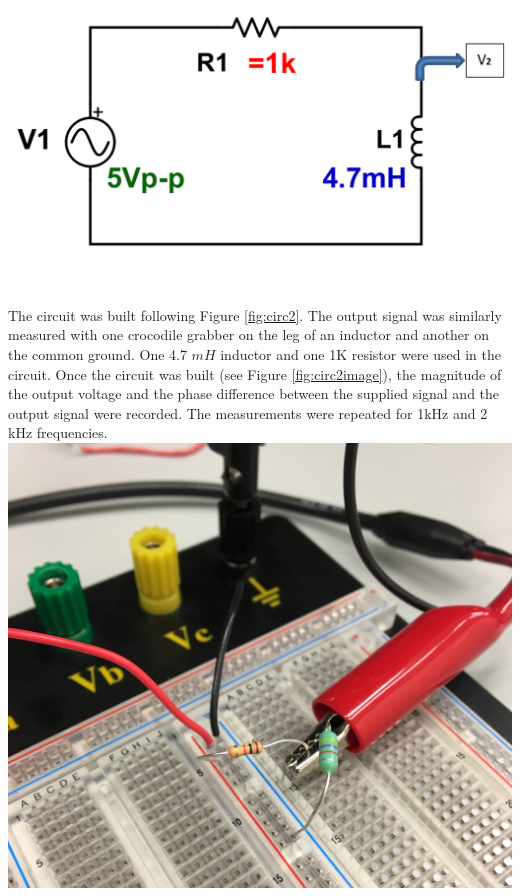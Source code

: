 \documentclass[journal]{IEEEtran}
\begin{document}
\begingroup
    \centering
    \medskip
    \includegraphics[width=\columnwidth]{images/lab8_circuit2.png}
    \label{fig:circ2}
    \medskip
\endgroup

\\
\medskip


\noindent The circuit was built following Figure \ref{fig:circ2}. The output signal was similarly measured with one crocodile grabber on the leg of an inductor and another on the common ground. One 4.7 $mH$ inductor and one 1K \ohm resistor were used in the circuit. Once the circuit was built (see Figure \ref{fig:circ2image}), the magnitude of the output voltage and the phase difference between the supplied signal and the output signal were recorded. The measurements were repeated for 1kHz and 2 kHz frequencies. \\

\begingroup
    \centering
    \medskip
    \includegraphics[width=\columnwidth]{images/lab8_circ2.jpg}
    \label{fig:circ2image}
    \medskip
\endgroup
\end{document}
